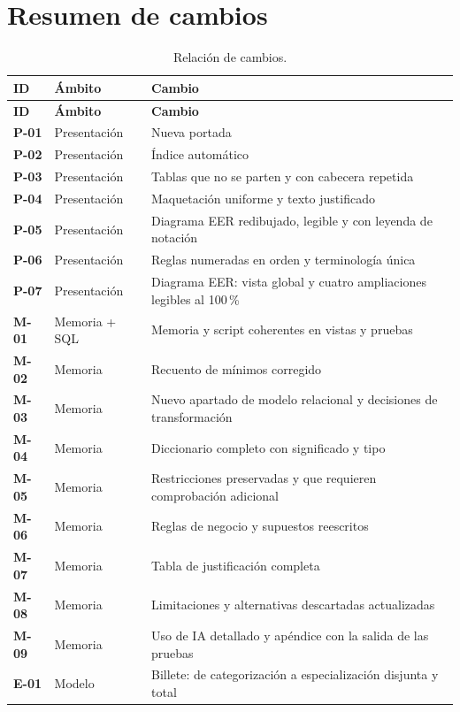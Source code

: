 \documentclass[11pt,a4paper]{article}
\DeclareRobustCommand{\_}{\textunderscore\allowbreak}
\begin{document}
\section{Resumen de cambios}
{\small
\begin{longtable}{@{}>{\bfseries}p{1.1cm} >{\raggedright\arraybackslash}p{2.6cm} >{\raggedright\arraybackslash}p{10.6cm}@{}}
\caption{Relación de cambios.}\\
\toprule
\textbf{ID} & \textbf{Ámbito} & \textbf{Cambio} \\
\midrule
\endfirsthead
\toprule
\textbf{ID} & \textbf{Ámbito} & \textbf{Cambio} \\
\midrule
\endhead
\bottomrule
\endfoot
P-01 & Presentación & Nueva portada \\
P-02 & Presentación & Índice automático \\
P-03 & Presentación & Tablas que no se parten y con cabecera repetida \\
P-04 & Presentación & Maquetación uniforme y texto justificado \\
P-05 & Presentación & Diagrama EER redibujado, legible y con leyenda de notación \\
P-06 & Presentación & Reglas numeradas en orden y terminología única \\
P-07 & Presentación & Diagrama EER: vista global y cuatro ampliaciones legibles al 100\,\% \\
\midrule
M-01 & Memoria + SQL & Memoria y script coherentes en vistas y pruebas \\
M-02 & Memoria & Recuento de mínimos corregido \\
M-03 & Memoria & Nuevo apartado de modelo relacional y decisiones de transformación \\
M-04 & Memoria & Diccionario completo con significado y tipo \\
M-05 & Memoria & Restricciones preservadas y que requieren comprobación adicional \\
M-06 & Memoria & Reglas de negocio y supuestos reescritos \\
M-07 & Memoria & Tabla de justificación completa \\
M-08 & Memoria & Limitaciones y alternativas descartadas actualizadas \\
M-09 & Memoria & Uso de IA detallado y apéndice con la salida de las pruebas \\
\midrule
E-01 & Modelo & Billete: de categorización a especialización disjunta y total \\

\end{longtable}}
\end{document}
